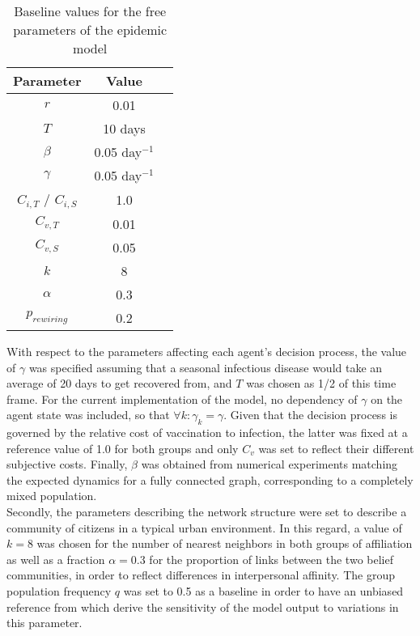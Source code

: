 \documentclass[11pt]{article}
\begin{document}
\begin{table}[htbp]
        \centering
        \begin{tabular}{|c|c|c|}
        \hline
                Parameter    &    Value       \\
         \hline
                 \(r\)       &    0.01        \\
	\hline
                 \(T\)       &    10 days        \\
        \hline
                 \(\beta\)   &    0.05 day\(^{-1}\)        \\
        \hline
                 \(\gamma\)   &    0.05  day\(^{-1}\)      \\
        \hline
                 \(C_{i,T}\) / \(C_{i,S}\) &    1.0    \\
        \hline
                 \(C_{v,T}\)  &    0.01       \\
        \hline
		 \(C_{v,S}\)  &    0.05       \\
        \hline
		 \(k\)  &    8      	      \\
        \hline
		 \(\alpha\)  &    0.3         \\
        \hline
		 \(p_{rewiring}\)  &    0.2   \\
        \hline
        \end{tabular}
        \caption{Baseline values for the free parameters of the epidemic model}
        \label{tab:Table1}
    \end{table}

With respect to the parameters affecting each agent's decision process, the value of \(\gamma\) was specified assuming that a seasonal infectious disease would take an average of 20 days to get recovered from, and \(T\) was chosen as 1/2 of this time frame. For the current implementation of the model, no dependency of \(\gamma\) on the agent state was included, so that \(\forall k : \gamma_{k} = \gamma\). Given that the decision process is governed by the relative cost of vaccination to infection, the latter was fixed at a reference value of 1.0 for both groups and only \(C_v\) was set to reflect their different subjective costs. Finally, \(\beta\) was obtained from numerical experiments matching the expected dynamics for a fully connected graph, corresponding to a completely mixed population.\\
Secondly, the parameters describing the network structure were set to describe a community of citizens in a typical urban environment. In this regard, a value of \(k = 8\) was chosen for the number of nearest neighbors in both groups of affiliation as well as a fraction \(\alpha = 0.3\) for the proportion of links between the two belief communities, in order to reflect differences in interpersonal affinity. The group population frequency \(q\) was set to 0.5 as a baseline in order to have an unbiased reference from which derive the sensitivity of the model output to variations in this parameter.
\end{document}
